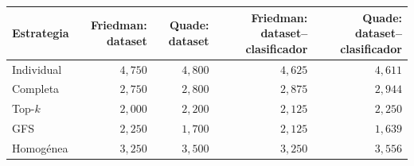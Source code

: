 \begin{resulttable}
\centering\fontsize{8.5}{10.5}\selectfont\setlength{\tabcolsep}{3.2pt}
\caption{Rankings medios de macro-F1 con las dos formas de agregación. Menor ranking indica mejor posición relativa.}
\label{tab:rankings-comparison}
\begin{tabular}{@{}lrrrr@{}}
\toprule
Estrategia & Friedman: dataset & Quade: dataset & Friedman: dataset--clasificador & Quade: dataset--clasificador \\
\midrule
Individual & $4{,}750$ & $4{,}800$ & $4{,}625$ & $4{,}611$ \\
Completa & $2{,}750$ & $2{,}800$ & $2{,}875$ & $2{,}944$ \\
Top-$k$ & $2{,}000$ & $2{,}200$ & $2{,}125$ & $2{,}250$ \\
GFS & $2{,}250$ & $1{,}700$ & $2{,}125$ & $1{,}639$ \\
Homogénea & $3{,}250$ & $3{,}500$ & $3{,}250$ & $3{,}556$ \\
\bottomrule
\end{tabular}
\par{}
\end{resulttable}
\FloatBarrier
